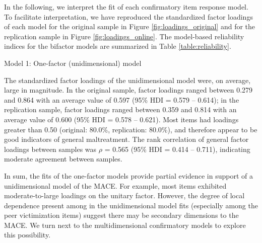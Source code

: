 \documentclass[letterpaper,man,natbib,longtable,floatsintext,12pt]{apa6}
\makeatletter
\renewcommand{\subsubsection}{\@startsection{subsubsection}{3}
  {\z@}%
  {\b@level@two@skip}{\e@level@two@skip}%
  {\normalfont\normalsize\bfseries}}
\makeatother
\begin{document}
In the following, we interpret the fit of each confirmatory item response model. To facilitate interpretation, we have reproduced the standardized factor loadings of each model for the original sample in Figure \ref{fig:loadings_original} and for the replication sample in Figure \ref{fig:loadings_online}. The model-based reliability indices for the bifactor models are summarized in Table \ref{table:reliability}. 

\subsubsection{Model 1: One-factor (unidimensional) model}

The standardized factor loadings of the unidimensional model were, on average, large in magnitude. In the original sample, factor loadings ranged between 0.279 and 0.864 with an average value of 0.597 (95\% HDI = 0.579 -- 0.614); in the replication sample, factor loadings ranged between 0.359 and 0.814 with an average value of 0.600 (95\% HDI = 0.578 -- 0.621). Most items had loadings greater than 0.50 (original: 80.0\%, replication: 80.0\%), and therefore appear to be good indicators of general maltreatment. The rank correlation of general factor loadings between samples was $\rho$ = 0.565 (95\% HDI = 0.414 -- 0.711), indicating moderate agreement between samples.

In sum, the fits of the one-factor models provide partial evidence in support of a unidimensional model of the MACE. For example, most items exhibited moderate-to-large loadings on the unitary factor. However, the degree of local dependence present among in the unidimensional model fits (especially among the peer victimization items) suggest there may be secondary dimensions to the MACE. We turn next to the multidimensional confirmatory models to explore this possibility.
\end{document}
